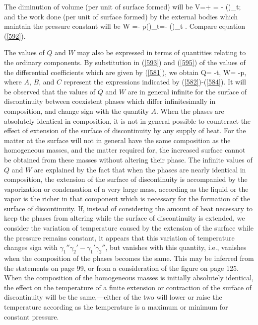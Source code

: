 \documentclass[12pt]{article}
\begin{document}
{The diminution of volume (per unit of surface formed) will be
\eqs V=+ = - \left(\right)_t;  \label{594} \eqe
and the work done (per unit of surface formed) by the external
bodies which maintain the pressure constant will be
\eqs W =- p\left(\right)_t=- \left(\right)_t . \label{595} \eqe
Compare equation (\ref{592}).

The values of $Q$ and $W$ may also be expressed in terms of quantities relating to the ordinary components. By substitution in (\ref{593}) and (\ref{595}) of the values of the differential coefficients which are given by (\ref{581}), we obtain
\eqs Q= -t,  \quad  W= -p,  \label{596} \eqe
where $A$, $B$, and $C$ represent the expressions indicated by (\ref{582})-(\ref{584}). It will be observed that the values of $Q$ and $W$ are in general infinite for the surface of discontinuity between coexistent phases which differ infinitesimally in composition, and change sign with the quantity $A$. When the phases are absolutely identical in composition, it is not in general possible to counteract the effect of extension of the surface of discontinuity by any supply of heat. For the matter at the surface will not in general have the same composition as the homogeneous masses, and the matter required for, the increased surface cannot be obtained from these masses without altering their phase. The infinite values of $Q$ and $W$ are explained by the fact that when the phases are nearly identical in composition, the extension of the surface of discontinuity is accompanied by the vaporization or condensation of a very large mass, according as the liquid or the vapor is the richer in that component which is necessary for the formation of the surface of discontinuity.
If, instead of considering the amount of heat necessary to keep the phases from altering while the surface of discontinuity is extended, we consider the variation of temperature caused by the extension of the surface while the pressure remains constant, it appears that this variation  of temperature changes sign with $\gamma_1''\gamma_2'- \gamma_1'\gamma_2''$, but vanishes with this quantity, i.e., vanishes when the composition of the phases becomes the same. This may be inferred from the statements on page 99, or from a consideration of the figure on page 125. When the composition of the homogeneous masses is initially absolutely identical, the effect on the temperature of a finite extension or contraction of the surface of discontinuity will be the same,---either of the two will lower or raise the temperature according as the temperature is a maximum or minimum for constant pressure.



}
\end{document}
